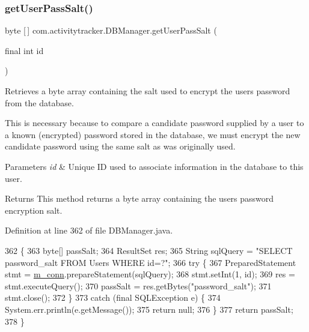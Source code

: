 \subsubsection{\texorpdfstring{get\+User\+Pass\+Salt()}{getUserPassSalt()}}
{\footnotesize\ttfamily byte \mbox{[}$\,$\mbox{]} com.\+activitytracker.\+D\+B\+Manager.\+get\+User\+Pass\+Salt (\begin{DoxyParamCaption}\item[{final int}]{id }\end{DoxyParamCaption})}

Retrieves a byte array containing the salt used to encrypt the user\textquotesingle{}s password from the database.

This is necessary because to compare a candidate password supplied by a user to a known (encrypted) password stored in the database, we must encrypt the new candidate password using the same salt as was originally used.


\begin{DoxyParams}{Parameters}
{\em id} & Unique ID used to associate information in the database to this user.\\
\hline
\end{DoxyParams}
\begin{DoxyReturn}{Returns}
This method returns a byte array containing the user\textquotesingle{}s password encryption salt. 
\end{DoxyReturn}


Definition at line 362 of file D\+B\+Manager.\+java.


\begin{DoxyCode}
362                                                 \{
363         byte[] passSalt;
364         ResultSet res;
365         String sqlQuery = \textcolor{stringliteral}{"SELECT password\_salt FROM Users WHERE id=?"};
366         \textcolor{keywordflow}{try} \{
367             PreparedStatement stmt = \mbox{\hyperlink{classcom_1_1activitytracker_1_1_d_b_manager_a064088d13ac09eb147fdc19268771521}{m\_conn}}.prepareStatement(sqlQuery);
368             stmt.setInt(1, \textcolor{keywordtype}{id});
369             res = stmt.executeQuery();
370             passSalt = res.getBytes(\textcolor{stringliteral}{"password\_salt"});
371             stmt.close();
372         \}
373         \textcolor{keywordflow}{catch} (\textcolor{keyword}{final} SQLException e) \{
374             System.err.println(e.getMessage());
375             \textcolor{keywordflow}{return} null;
376         \}
377         \textcolor{keywordflow}{return} passSalt;
378     \}
\end{DoxyCode}
\mbox{\label{classcom_1_1activitytracker_1_1_d_b_manager_a4e695c111b877cfd1d918602551f65a1}} 
